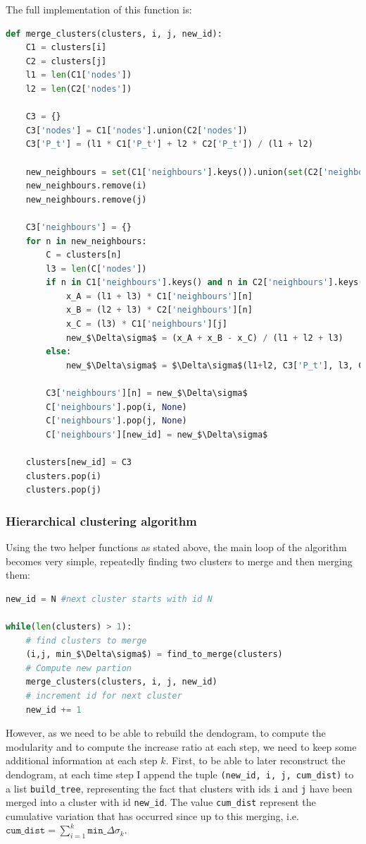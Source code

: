\documentclass[12pt]{article}
\theoremstyle{definition}
\begin{document}
The full implementation of this function is:
\begin{lstlisting}[language=Python, mathescape]
def merge_clusters(clusters, i, j, new_id):
    C1 = clusters[i]
    C2 = clusters[j]    
    l1 = len(C1['nodes'])
    l2 = len(C2['nodes'])
    
    C3 = {}
    C3['nodes'] = C1['nodes'].union(C2['nodes'])
    C3['P_t'] = (l1 * C1['P_t'] + l2 * C2['P_t']) / (l1 + l2)

    new_neighbours = set(C1['neighbours'].keys()).union(set(C2['neighbours'].keys()))
    new_neighbours.remove(i)
    new_neighbours.remove(j)
    
    C3['neighbours'] = {}
    for n in new_neighbours:
        C = clusters[n]
        l3 = len(C['nodes'])
        if n in C1['neighbours'].keys() and n in C2['neighbours'].keys():
            x_A = (l1 + l3) * C1['neighbours'][n]
            x_B = (l2 + l3) * C2['neighbours'][n]
            x_C = (l3) * C1['neighbours'][j]
            new_$\Delta\sigma$ = (x_A + x_B - x_C) / (l1 + l2 + l3)
        else:
            new_$\Delta\sigma$ = $\Delta\sigma$(l1+l2, C3['P_t'], l3, C['P_t'])
        
        C3['neighbours'][n] = new_$\Delta\sigma$
        C['neighbours'].pop(i, None)
        C['neighbours'].pop(j, None)
        C['neighbours'][new_id] = new_$\Delta\sigma$
    
    clusters[new_id] = C3
    clusters.pop(i)
    clusters.pop(j)
\end{lstlisting}
    
\subsubsection{Hierarchical clustering algorithm}
Using the two helper functions as stated above, the main loop of the algorithm becomes very simple, repeatedly finding two clusters to merge and then merging them:
\begin{lstlisting}[language=Python, mathescape]
new_id = N #next cluster starts with id N

while(len(clusters) > 1):    
    # find clusters to merge
    (i,j, min_$\Delta\sigma$) = find_to_merge(clusters)
    # Compute new partion
    merge_clusters(clusters, i, j, new_id)
    # increment id for next cluster
    new_id += 1
\end{lstlisting}
However, as we need to be able to rebuild the dendogram, to compute the modularity and to compute the increase ratio at each step, we need to keep some additional information at each step $k$. First, to be able to later reconstruct the dendogram, at each time step I append the tuple \texttt{(new\_id, i, j, cum\_dist)}  to a list \texttt{build\_tree}, representing the fact that clusters with ids \texttt{i} and \texttt{j} have been merged into a cluster with id \texttt{new\_id}. The value \texttt{cum\_dist} represent the cumulative variation that has occurred since up to this merging, i.e.\ $\texttt{cum\_dist} = \sum_{i=1}^k \texttt{min\_}\Delta\sigma_k$.
\end{document}
